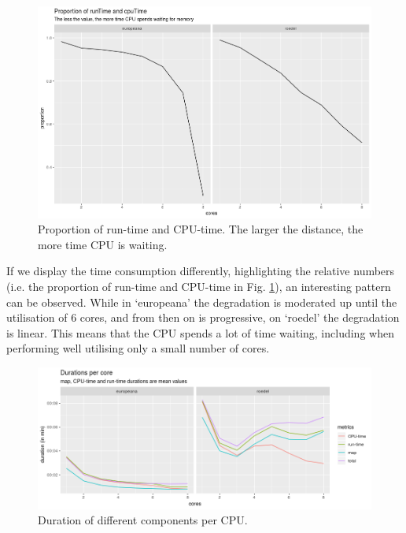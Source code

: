 \begin{figure}
\includegraphics[width=\textwidth]{images/chapter06/runtime-vs-cputime.png}
\caption{Proportion of run-time and CPU-time. The larger the distance, the more time CPU is waiting.}
\label{runtime-vs-cputime}
\end{figure}

If we display the time consumption differently, highlighting the relative numbers (i.e. the proportion of run-time and CPU-time in Fig. \ref{runtime-vs-cputime}), an interesting pattern can be observed. While in `europeana' the degradation is moderated up until the utilisation of 6 cores, and from then on is progressive, on `roedel' the degradation is linear. This means that the CPU spends a lot of time waiting, including when performing well utilising only a small number of cores.

\begin{figure}
\includegraphics[width=\textwidth]{images/chapter06/all-durations.png}
\caption{Duration of different components per CPU.}
\label{all-durations}
\end{figure}

